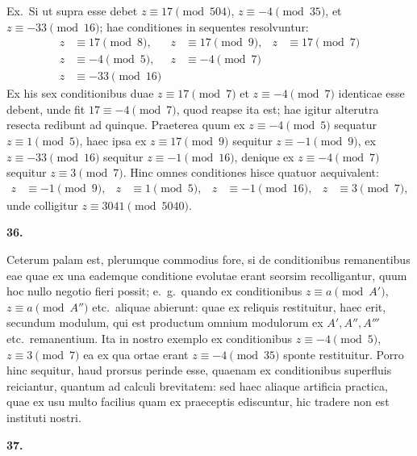 \documentclass[12pt,a4paper]{article}
\theoremstyle{plain}
\theoremstyle{definition}
\theoremstyle{remark}
\begin{document}
Ex.\ Si ut supra esse debet $z \equiv 17 \pmod{504}$, $z \equiv -4 \pmod{35}$, et $z \equiv -33 \pmod{16}$; hae conditiones in sequentes resolvuntur:
\begin{align*}
z &\equiv 17 \pmod{8}, & z &\equiv 17 \pmod{9}, & z &\equiv 17 \pmod{7}\\
z &\equiv -4 \pmod{5}, & z &\equiv -4 \pmod{7}\\
z &\equiv -33 \pmod{16}
\end{align*}
Ex his sex conditionibus duae $z \equiv 17 \pmod{7}$ et $z \equiv -4 \pmod{7}$ identicae esse debent, unde fit $17 \equiv -4 \pmod{7}$, quod reapse ita est; hae igitur alterutra resecta redibunt ad quinque. Praeterea quum ex $z \equiv -4 \pmod{5}$ sequatur $z \equiv 1 \pmod{5}$, haec ipsa ex $z \equiv 17 \pmod{9}$ sequitur $z \equiv -1 \pmod{9}$, ex $z \equiv -33 \pmod{16}$ sequitur $z \equiv -1 \pmod{16}$, denique ex $z \equiv -4 \pmod{7}$ sequitur $z \equiv 3 \pmod{7}$. Hinc omnes conditiones hisce quatuor aequivalent:
\begin{align*}
z &\equiv -1 \pmod{9}, & z &\equiv 1 \pmod{5}, & z &\equiv -1 \pmod{16}, & z &\equiv 3 \pmod{7},
\end{align*}
unde colligitur $z \equiv 3041 \pmod{5040}$.

\textbf{36.}

Ceterum palam est, plerumque commodius fore, si de conditionibus remanentibus eae quae ex una eademque conditione evolutae erant seorsim recolligantur, quum hoc nullo negotio fieri possit; e.~g.\ quando ex conditionibus $z \equiv a \pmod{A'}$, $z \equiv a \pmod{A''}$ etc.\ aliquae abierunt: quae ex reliquis restituitur, haec erit, secundum modulum, qui est productum omnium modulorum ex $A', A'', A'''$ etc.\ remanentium. Ita in nostro exemplo ex conditionibus $z \equiv -4 \pmod{5}$, $z \equiv 3 \pmod{7}$ ea ex qua ortae erant $z \equiv -4 \pmod{35}$ sponte restituitur. Porro hinc sequitur, haud prorsus perinde esse, quaenam ex conditionibus superfluis reiciantur, quantum ad calculi brevitatem: sed haec aliaque artificia practica, quae ex usu multo facilius quam ex praeceptis ediscuntur, hic tradere non est instituti nostri.

\textbf{37.}
\end{document}
